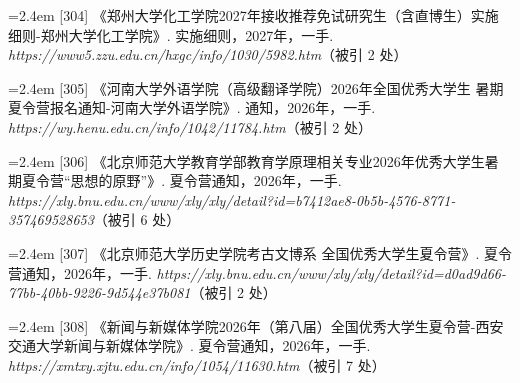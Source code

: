 {\vspace{0.6pt}
\vspace{3.5pt}\par
\nopagebreak\vspace{1pt}
\noindent\hangindent=2.4em \label{src:S0396}{\color{cAccent}[304]} 《郑州大学化工学院2027年接收推荐免试研究生（含直博生）实施细则-郑州大学化工学院》. 实施细则，2027年，一手. \textit{https://www5.zzu.edu.cn/hxgc/info/1030/5982.htm}（被引 2 处）\par
\vspace{0.6pt}
\vspace{3.5pt}\par
\nopagebreak\vspace{1pt}
\noindent\hangindent=2.4em \label{src:S0399}{\color{cAccent}[305]} 《河南大学外语学院（高级翻译学院）2026年全国优秀大学生 暑期夏令营报名通知-河南大学外语学院》. 通知，2026年，一手. \textit{https://wy.henu.edu.cn/info/1042/11784.htm}（被引 2 处）\par
\vspace{0.6pt}
\vspace{3.5pt}\par
\nopagebreak\vspace{1pt}
\noindent\hangindent=2.4em \label{src:S0401}{\color{cAccent}[306]} 《北京师范大学教育学部教育学原理相关专业2026年优秀大学生暑期夏令营“思想的原野”》. 夏令营通知，2026年，一手. \textit{https://xly.bnu.edu.cn/www/xly/xly/detail?id=b7412ae8-0b5b-4576-8771-357469528653}（被引 6 处）\par
\vspace{0.6pt}
\noindent\hangindent=2.4em \label{src:S0402}{\color{cAccent}[307]} 《北京师范大学历史学院考古文博系 全国优秀大学生夏令营》. 夏令营通知，2026年，一手. \textit{https://xly.bnu.edu.cn/www/xly/xly/detail?id=d0ad9d66-77bb-40bb-9226-9d544e37b081}（被引 2 处）\par
\vspace{0.6pt}
\vspace{3.5pt}\par
\nopagebreak\vspace{1pt}
\noindent\hangindent=2.4em \label{src:S0403}{\color{cAccent}[308]} 《新闻与新媒体学院2026年（第八届）全国优秀大学生夏令营-西安交通大学新闻与新媒体学院》. 夏令营通知，2026年，一手. \textit{https://xmtxy.xjtu.edu.cn/info/1054/11630.htm}（被引 7 处）\par
}
